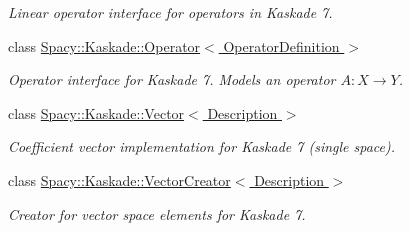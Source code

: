 \begin{DoxyCompactItemize}
\begin{DoxyCompactList}\small\item\em Linear operator interface for operators in Kaskade 7. \end{DoxyCompactList}\item 
class \hyperlink{classSpacy_1_1Kaskade_1_1Operator}{Spacy\+::\+Kaskade\+::\+Operator$<$ Operator\+Definition $>$}
\begin{DoxyCompactList}\small\item\em Operator interface for Kaskade 7. Models an operator $A:X\rightarrow Y$. \end{DoxyCompactList}\item 
class \hyperlink{classSpacy_1_1Kaskade_1_1Vector}{Spacy\+::\+Kaskade\+::\+Vector$<$ Description $>$}
\begin{DoxyCompactList}\small\item\em Coefficient vector implementation for Kaskade 7 (single space). \end{DoxyCompactList}\item 
class \hyperlink{classSpacy_1_1Kaskade_1_1VectorCreator}{Spacy\+::\+Kaskade\+::\+Vector\+Creator$<$ Description $>$}
\begin{DoxyCompactList}\small\item\em Creator for vector space elements for Kaskade 7. \end{DoxyCompactList}\end{DoxyCompactItemize}
